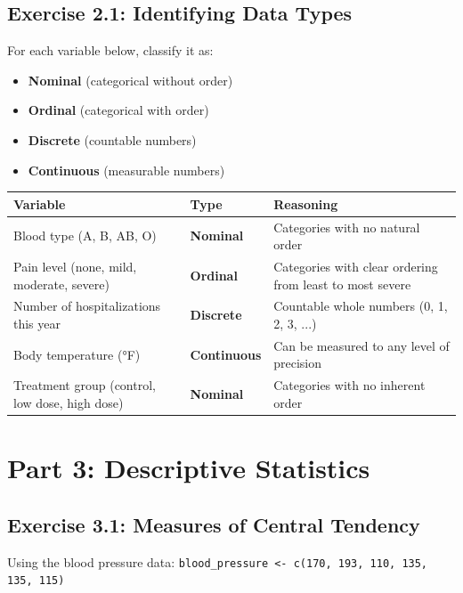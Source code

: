 \documentclass[11pt]{article}
\begin{document}
\subsection{Exercise 2.1: Identifying Data Types}
For each variable below, classify it as:
\begin{itemize}
\item \textbf{Nominal} (categorical without order)
\item \textbf{Ordinal} (categorical with order)
\item \textbf{Discrete} (countable numbers)
\item \textbf{Continuous} (measurable numbers)
\end{itemize}

\begin{center}
\begin{tabular}{|>{\raggedright\arraybackslash}p{4.8cm}|>{\centering\arraybackslash}p{2.2cm}|>{\raggedright\arraybackslash}p{5.5cm}|}
\hline
\textbf{Variable} & \textbf{Type} & \textbf{Reasoning} \\
\hline
Blood type (A, B, AB, O) & \textcolor{answergreen}{\textbf{Nominal}} & \textcolor{answergreen}{Categories with no natural order} \\[2ex]
\hline
Pain level (none, mild, moderate, severe) & \textcolor{answergreen}{\textbf{Ordinal}} & \textcolor{answergreen}{Categories with clear ordering from least to most severe} \\[2ex]
\hline
Number of hospitalizations this year & \textcolor{answergreen}{\textbf{Discrete}} & \textcolor{answergreen}{Countable whole numbers (0, 1, 2, 3, ...)} \\[2ex]
\hline
Body temperature (°F) & \textcolor{answergreen}{\textbf{Continuous}} & \textcolor{answergreen}{Can be measured to any level of precision} \\[2ex]
\hline
Treatment group (control, low dose, high dose) & \textcolor{answergreen}{\textbf{Nominal}} & \textcolor{answergreen}{Categories with no inherent order} \\[2ex]
\hline
\end{tabular}
\end{center}

\section{Part 3: Descriptive Statistics}

\subsection{Exercise 3.1: Measures of Central Tendency}
Using the blood pressure data: \texttt{blood\_pressure <- c(170, 193, 110, 135, 135, 115)}
\end{document}
